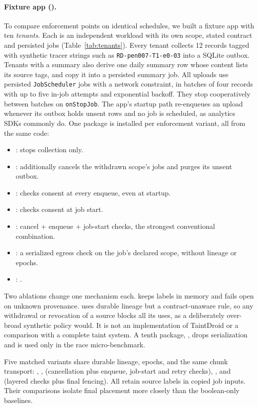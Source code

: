 \paragraph{Fixture app (\lab).} To compare enforcement points on identical schedules, we built a fixture app with ten
\emph{tenants}. Each is an independent workload with its own scope, stated contract and persisted jobs (Table~\ref{tab:tenants}).
Every tenant collects 12 records tagged with synthetic tracer strings such as \texttt{RD-pen007-T1-e0-03} into a SQLite
outbox. Tenants with a summary also derive one daily summary row whose content lists its source tags, and copy it into a
persisted summary job. All uploads use persisted \texttt{JobScheduler} jobs with a network constraint, in batches of four
records with up to five in-job attempts and exponential backoff. They stop cooperatively between batches on
\texttt{onStopJob}. The app's startup path re-enqueues an upload whenever its outbox holds unsent rows and no job is
scheduled, as analytics SDKs commonly do. One package is installed per enforcement variant, all from the same code:
\begin{itemize}[leftmargin=*,nosep]
\item {}: stops collection only.
\item {}: additionally cancels the withdrawn scope's jobs and purges its unsent outbox.
\item {}: checks consent at every enqueue, even at startup.
\item {}: checks consent at job start.
\item {}: cancel + enqueue + job-start checks, the strongest conventional combination.
\item {}: a serialized egress check on the job's declared scope, without lineage or epochs.
\item {}: \sys.
\end{itemize}
Two ablations change one \sys mechanism each.  keeps labels in memory and fails open on unknown
provenance.  uses durable lineage but a contract-unaware rule, so any withdrawal or revocation of a source
blocks all its uses, as a deliberately over-broad synthetic policy would. It is not an implementation of TaintDroid or a comparison with a complete taint system. A tenth package, , drops serialization and is
used only in the race micro-benchmark.

Five matched variants share durable lineage, epochs, and the same chunk transport:
, ,  (cancellation plus enqueue, job-start and retry checks),
, and  (layered checks plus final fencing). All retain source labels
in copied job inputs. Their comparisons isolate final placement more closely than the boolean-only baselines.

